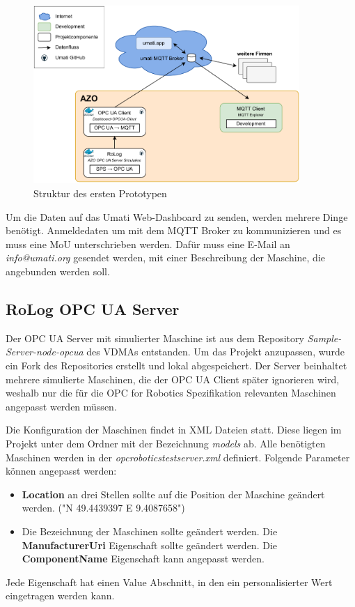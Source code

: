 \documentclass[a4paper, 12pt, oneside, toc=listofnumbered, bibliography=totoc]{scrbook}
\begin{document}
		\begin{figure}[H]
			\centering
			\includegraphics[width=0.9\textwidth]{res/implementierung/Prototyp-umatiWeb.pdf}
			\caption{Struktur des ersten Prototypen}
			\label{fig:Prototyp1}
		\end{figure}
		
		Um die Daten auf das Umati Web-Dashboard zu senden, werden mehrere Dinge benötigt. Anmeldedaten um mit dem MQTT Broker zu kommunizieren und es muss eine \ac{MoU} unterschrieben werden. Dafür muss eine E-Mail an \textit{info@umati.org} gesendet werden, mit einer Beschreibung der Maschine, die angebunden werden soll. 
		
		\subsection{RoLog OPC UA Server}\label{ch:RoLogOPCUA}
		
		Der OPC UA Server mit simulierter Maschine ist aus dem Repository \textit{Sample-Server-node-opcua} des VDMAs entstanden. Um das Projekt anzupassen, wurde ein Fork des Repositories erstellt und lokal abgespeichert. Der Server beinhaltet mehrere simulierte Maschinen, die der OPC UA Client später ignorieren wird, weshalb nur die für die OPC for Robotics Spezifikation relevanten Maschinen angepasst werden müssen. 
		
		Die Konfiguration der Maschinen findet in XML Dateien statt. Diese liegen im Projekt unter dem Ordner mit der Bezeichnung \textit{models} ab. Alle benötigten Maschinen werden in der \textit{opcroboticstestserver.xml} definiert. Folgende Parameter können angepasst werden:
		
		\begin{itemize}
			\item \textbf{Location} an drei Stellen sollte auf die Position der Maschine geändert werden. ("N 49.4439397 E 9.4087658")
			\item Die Bezeichnung der Maschinen sollte geändert werden.
			\subitem Die \textbf{ManufacturerUri} Eigenschaft sollte geändert werden.
			\subitem Die \textbf{ComponentName} Eigenschaft kann angepasst werden. 
		\end{itemize}
		Jede Eigenschaft hat einen Value Abschnitt, in den ein personalisierter Wert eingetragen werden kann.
		
\end{document}
